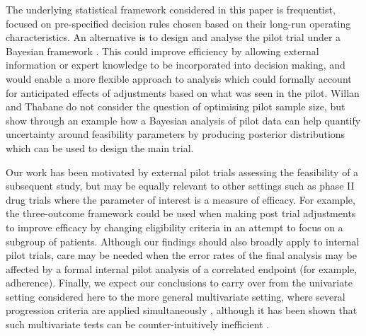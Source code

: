 \documentclass[referee, lineno, pdflatex,sn-vancouver,Numbered]{sn-jnl}%
\theoremstyle{thmstyleone}%
\theoremstyle{thmstyletwo}%
\theoremstyle{thmstylethree}%
\begin{document}
The underlying statistical framework considered in this paper is frequentist, focused on pre-specified decision rules chosen based on their long-run operating characteristics. An alternative is to design and analyse the pilot trial under a Bayesian framework \cite{Hampson2017, Wilson2021, Lv2023}. This could improve efficiency by allowing external information or expert knowledge to be incorporated into decision making, and would enable a more flexible approach to analysis which could formally account for anticipated effects of adjustments based on what was seen in the pilot. Willan and Thabane \cite{Willan2020} do not consider the question of optimising pilot sample size, but show through an example how a Bayesian analysis of pilot data can help quantify uncertainty around feasibility parameters by producing posterior distributions which can be used to design the main trial. 


Our work has been motivated by external pilot trials assessing the feasibility of a subsequent study, but may be equally relevant to other settings such as phase II drug trials where the parameter of interest is a measure of efficacy. For example, the three-outcome framework could be used when making post trial adjustments to improve efficacy by changing eligibility criteria in an attempt to focus on a subgroup of patients. Although our findings should also broadly apply to internal pilot trials, care may be needed when the error rates of the final analysis may be affected by a formal internal pilot analysis of a correlated endpoint (for example, adherence). Finally, we expect our conclusions to carry over from the univariate setting considered here to the more general multivariate setting, where several progression criteria are applied simultaneously \cite{Lewis2021a}, although it has been shown that such multivariate tests can be counter-intuitively inefficient \cite{Wilson2021a}.
\end{document}
